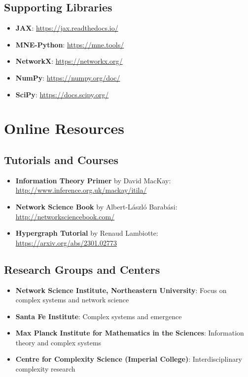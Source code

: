 \documentclass[
  11pt,
  letterpaper,
  oneside,
  openany]{book}
\providecommand{\tightlist}{%
  \setlength{\itemsep}{0pt}\setlength{\parskip}{0pt}}
\begin{document}
\subsection*{Supporting Libraries}\label{supporting-libraries}

\begin{itemize}
\tightlist
\item
  \textbf{JAX}: \url{https://jax.readthedocs.io/}
\item
  \textbf{MNE-Python}: \url{https://mne.tools/}
\item
  \textbf{NetworkX}: \url{https://networkx.org/}
\item
  \textbf{NumPy}: \url{https://numpy.org/doc/}
\item
  \textbf{SciPy}: \url{https://docs.scipy.org/}
\end{itemize}

\section*{Online Resources}\label{online-resources-1}


\subsection*{Tutorials and Courses}\label{tutorials-and-courses}

\begin{itemize}
\tightlist
\item
  \textbf{Information Theory Primer} by David MacKay:
  \url{http://www.inference.org.uk/mackay/itila/}
\item
  \textbf{Network Science Book} by Albert-László Barabási:
  \url{http://networksciencebook.com/}
\item
  \textbf{Hypergraph Tutorial} by Renaud Lambiotte:
  \url{https://arxiv.org/abs/2301.02773}
\end{itemize}

\subsection*{Research Groups and
Centers}\label{research-groups-and-centers}

\begin{itemize}
\tightlist
\item
  \textbf{Network Science Institute, Northeastern University}: Focus on
  complex systems and network science
\item
  \textbf{Santa Fe Institute}: Complex systems and emergence
\item
  \textbf{Max Planck Institute for Mathematics in the Sciences}:
  Information theory and complex systems
\item
  \textbf{Centre for Complexity Science (Imperial College)}:
  Interdisciplinary complexity research
\end{itemize}
\end{document}

